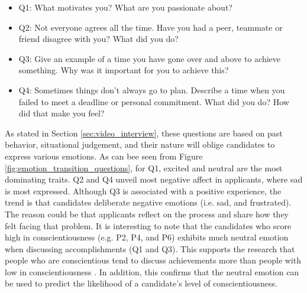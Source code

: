 %
%
\begin{itemize}
    \item[] Q1: What motivates you? What are you passionate about?
    \item[] Q2: Not everyone agrees all the time. Have you had a peer, teammate or friend disagree with you? What did you do?
    \item[] Q3: Give an example of a time you have gone over and above to achieve something. Why was it important for you to achieve this?
    \item[] Q4: Sometimes things don’t always go to plan. Describe a time when you failed to meet a deadline or personal commitment. What did you do? How did that make you feel? 
\end{itemize}
%
As stated in Section \ref{sec:video_interview}, these questions are based on past behavior, situational judgement, and their nature will oblige candidates to express various emotions. As can bee seen from Figure \ref{fig:emotion_transition_questions}, for Q1, excited and neutral are the most dominating traits. Q2 and Q4 unveil most negative affect in applicants, where sad is most expressed. Although Q3 is associated with a positive experience, the trend is that candidates deliberate negative emotions (i.e. sad, and frustrated). The reason could be that applicants reflect on the process and share how they felt facing that problem. It is interesting to note that the candidates who score high in conscientiousness (e.g. P2, P4, and P6) exhibits much neutral emotion when discussing accomplishments (Q1 and Q3). This supports the research that people who are conscientious tend to discuss achievements more than people with low in conscientiousness \cite{conscientiousness1-HIRSH2009524}. In addition, this confirms that the neutral emotion can be used to predict the likelihood of a candidate's level of conscientiousness. 

